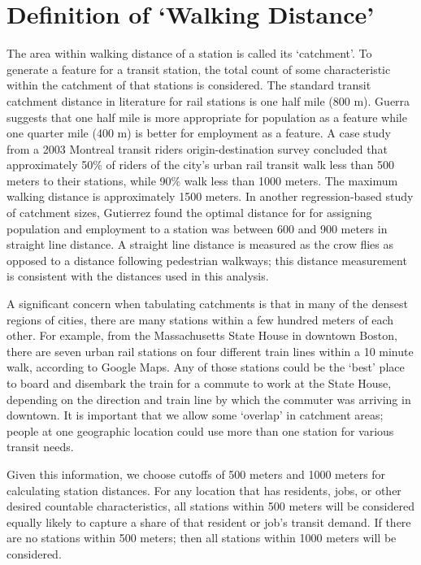 \documentclass[11pt]{report}
\begin{document}
\section{Definition of `Walking Distance'}\label{sec:walk}

The area within walking distance of a station is called its `catchment'. To generate a feature for a transit station, the total count of some characteristic within the catchment of that stations is considered. The standard transit catchment distance in literature for rail stations is one half mile (800 m). Guerra \cite{Guerra2012} suggests that one half mile is more appropriate for population as a feature while one quarter mile (400 m) is better for employment as a feature. A case study \cite{ElGeneidy2014} from a 2003 Montreal transit riders origin-destination survey concluded that approximately 50\% of riders of the city's urban rail transit walk less than 500 meters to their stations, while 90\% walk less than 1000 meters. The maximum walking distance is approximately 1500 meters. In another regression-based study of catchment sizes, Gutierrez \cite{Gutierrez2011} found the optimal distance for  for assigning population and employment to a station was between 600 and 900 meters in straight line distance. A straight line distance is measured as the crow flies as opposed to a distance following pedestrian walkways; this distance measurement is consistent with the distances used in this analysis.

A significant concern when tabulating catchments is that in many of the densest regions of cities, there are many stations within a few hundred meters of each other. For example, from the Massachusetts State House in downtown Boston, there are seven urban rail stations on four different train lines within a 10 minute walk, according to Google Maps. Any of those stations could be the `best' place to board and disembark the train for a commute to work at the State House, depending on the direction and train line by which the commuter was arriving in downtown. It is important that we allow some `overlap' in catchment areas; people at one geographic location could use more than one station for various transit needs. 

Given this information, we choose cutoffs of 500 meters and 1000 meters for calculating station distances. For any location that has residents, jobs, or other desired countable characteristics, all stations within 500 meters will be considered equally likely to capture a share of that resident or job's transit demand. If there are no stations within 500 meters; then all stations within 1000 meters will be considered. 
\end{document}
